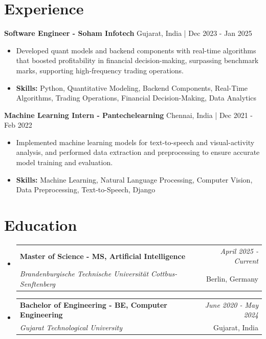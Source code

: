 \documentclass[a4paper,11pt]{article}
\makeatletter
\newcommand{\resumeSubheading}[4]{
\vspace{0.5mm}\item
    \begin{tabular*}{\linewidth}[t]{l@{\extracolsep{\fill}}r}
        \textbf{#1} & \textit{\footnotesize{#4}} \\
        \textit{\footnotesize{#3}} &  \footnotesize{#2}\\
    \end{tabular*}
    \vspace{-2.4mm}
}
\makeatother
\begin{document}
\section{\textbf{Experience}}


\vspace{1mm}
  \textbf{Software Engineer - Soham Infotech} \hfill Gujarat, India | Dec 2023 - Jan 2025
\vspace{-1.5mm} %
\begin{itemize}
  \item Developed quant models and backend components with real-time algorithms that boosted profitability in financial decision-making, surpassing benchmark marks, supporting high-frequency trading operations.

\vspace{-2mm}
  \item \textbf{Skills:} Python, Quantitative Modeling, Backend Components, Real-Time Algorithms, Trading Operations, Financial Decision-Making, Data Analytics
\end{itemize}

\vspace{1mm}
  \textbf{Machine Learning Intern - Pantechelearning} \hfill Chennai, India | Dec 2021 - Feb 2022
\vspace{-1.5mm} %
\begin{itemize}
  \item Implemented machine learning models for text-to-speech and visual-activity analysis, and performed data extraction and preprocessing to ensure accurate model training and evaluation.
\vspace{-2mm}
  \item \textbf{Skills:} Machine Learning, Natural Language Processing, Computer Vision, Data Preprocessing, Text-to-Speech, Django
\end{itemize}\section{\textbf{Education}}
\vspace{-0.4mm}

\begin{itemize}[leftmargin=0.15in, label={}]
\resumeSubheading
{Master of Science - MS, Artificial Intelligence }{Berlin, Germany}
{Brandenburgische Technische Universität Cottbus-Senftenberg  }{April 2025 - Current}

\vspace{1.0mm} %
\resumeSubheading
{Bachelor of Engineering - BE, Computer Engineering  }{Gujarat, India}
{Gujarat Technological University }{June 2020 - May 2024}

\end{itemize}
\end{document}

